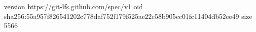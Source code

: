 version https://git-lfs.github.com/spec/v1
oid sha256:55a957f826541202c778daf752f179f525ae22c58b905cc01fc11404db52ee49
size 5566
